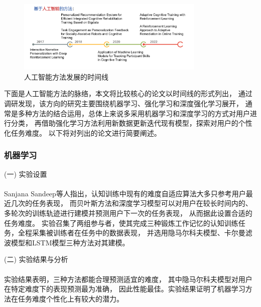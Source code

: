 \documentclass[12pt]{article}
\begin{document}
        \subsubsection{}
        \begin{figure}[H]
            	
            \centering
            \includegraphics[width=0.8\textwidth]{images/timeline_AI.png}
            \caption{人工智能方法发展的时间线}
            \label{fig:label}
        \end{figure}
        下面是人工智能方法的脉络，本文将比较核心的论文以时间线的形式列出，
        通过调研发现，该方向的研究主要围绕机器学习、强化学习和深度强化学习展开，
        通常是多种方法的结合运用，总体上来说多采用机器学习和深度学习的方式对用户进行分类，
        再借助强化学习方法利用新数据更新迭代现有模型，探索对用户的个性化任务难度。
        以下将对列出的论文进行简要阐述。

        \subsubsection{机器学习}
            (一) 实验设置\paragraph{}
            Sanjana Sandeep\cite{ref16}等人指出，认知训练中现有的难度自适应算法大多只参考用户最近几次的任务表现，
            而贝叶斯方法和深度学习模型可以对用户在较长时间内的、多轮次的训练轨迹进行建模并预测用户下一次的任务表现，
            从而据此设置合适的任务难度。
            实验召集了两组参与者，使其完成三种锻炼工作记忆的认知训练任务，全程采集被训练者在任务中的数据表现，
            并选用隐马尔科夫模型、卡尔曼滤波模型和LSTM模型三种方法对其建模。

            (二) 实验结果与分析\paragraph{}
            实验结果表明，三种方法都能合理预测适宜的难度，
            其中隐马尔科夫模型对用户在特定难度下的表现预测最为准确，
            因此性能最佳。实验结果证明了机器学习方法在任务难度个性化上有较大的潜力。
\end{document}

